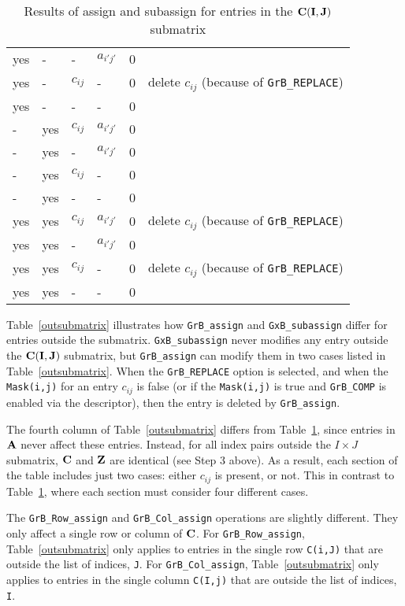 \documentclass[12pt]{article}
\begin{document}
\begin{table}
{\begin{tabular}{lllll|l}
    yes&-   &  -       & $a_{i'j'}$  & 0    &   \\
    yes&-   & $c_{ij}$ &  -          & 0    &  delete $c_{ij}$  (because of \verb'GrB_REPLACE') \\
    yes&-   &  -       &  -          & 0    &   \\
\hline
    -  &yes & $c_{ij}$ & $a_{i'j'}$  & 0    &   \\
    -  &yes &  -       & $a_{i'j'}$  & 0    &   \\
    -  &yes & $c_{ij}$ &  -          & 0    &   \\
    -  &yes &  -       &  -          & 0    &   \\
\hline
    yes&yes & $c_{ij}$ & $a_{i'j'}$  & 0    &  delete $c_{ij}$  (because of \verb'GrB_REPLACE') \\
    yes&yes &  -       & $a_{i'j'}$  & 0    &   \\
    yes&yes & $c_{ij}$ &  -          & 0    &  delete $c_{ij}$  (because of \verb'GrB_REPLACE') \\
    yes&yes &  -       &  -          & 0    &   \\
\hline
\end{tabular}
}
\caption{Results of assign and subassign for entries in the ${\bf C(I,J)}$ submatrix \label{insubmatrix}}
\end{table}

\newpage
Table~\ref{outsubmatrix} illustrates how \verb'GrB_assign' and
\verb'GxB_subassign' differ for entries outside the submatrix.
\verb'GxB_subassign' never modifies any entry outside the ${\bf C(I,J)}$
submatrix, but \verb'GrB_assign' can modify them in two cases listed in
Table~\ref{outsubmatrix}.  When the \verb'GrB_REPLACE' option is selected, and
when the \verb'Mask(i,j)' for an entry $c_{ij}$ is false (or if the
\verb'Mask(i,j)' is true and \verb'GrB_COMP' is enabled via the descriptor),
then the entry is deleted by \verb'GrB_assign'.

The fourth column of Table~\ref{outsubmatrix} differs from
Table~\ref{insubmatrix}, since entries in ${\bf A}$ never affect these entries.
Instead, for all index pairs outside the $I \times J$ submatrix, ${\bf C}$ and
${\bf Z}$ are identical (see Step 3 above).  As a result, each section of the
table includes just two cases: either $c_{ij}$ is present, or not.   This in
contrast to Table~\ref{insubmatrix}, where each section must consider four
different cases.

The \verb'GrB_Row_assign' and \verb'GrB_Col_assign' operations are slightly
different.  They only affect a single row or column of ${\bf C}$.
For \verb'GrB_Row_assign', Table~\ref{outsubmatrix} only applies to entries in
the single row \verb'C(i,J)' that are outside the list of indices, \verb'J'.
For \verb'GrB_Col_assign', Table~\ref{outsubmatrix} only applies to entries in
the single column \verb'C(I,j)' that are outside the list of indices, \verb'I'.
\end{document}
